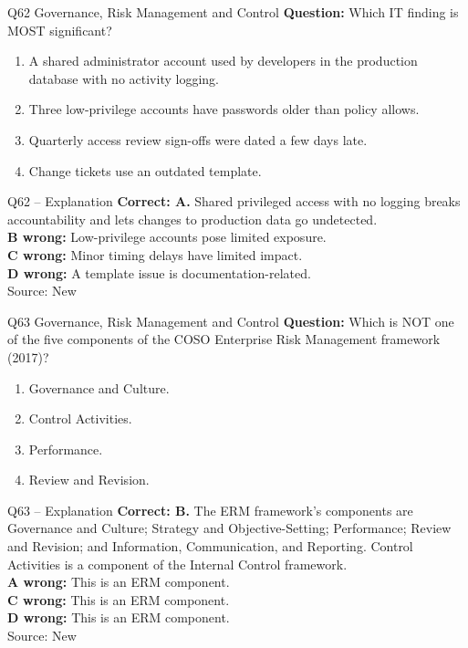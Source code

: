 \documentclass[aspectratio=169,10pt]{beamer}
\begin{document}
\begin{frame}[t]{Q62 \hfill {\scriptsize Governance, Risk Management and Control}}
	\small
	\textbf{Question:} Which IT finding is MOST significant?
	\begin{enumerate}[label=\Alph*.,itemsep=1pt,topsep=3pt]
			\item A shared administrator account used by developers in the production database with no activity logging.
			\item Three low-privilege accounts have passwords older than policy allows.
			\item Quarterly access review sign-offs were dated a few days late.
			\item Change tickets use an outdated template.
	\end{enumerate}
\end{frame}

\begin{frame}[t]{Q62 -- Explanation}
	\footnotesize
	\textbf{Correct: A.} Shared privileged access with no logging breaks accountability and lets changes to production data go undetected. \\[5pt]
\textbf{B wrong:} Low-privilege accounts pose limited exposure. \\[3pt]
\textbf{C wrong:} Minor timing delays have limited impact. \\[3pt]
\textbf{D wrong:} A template issue is documentation-related. \\[3pt]
	\vfill {\tiny Source: New}
\end{frame}

\begin{frame}[t]{Q63 \hfill {\scriptsize Governance, Risk Management and Control}}
	\small
	\textbf{Question:} Which is NOT one of the five components of the COSO Enterprise Risk Management framework (2017)?
	\begin{enumerate}[label=\Alph*.,itemsep=1pt,topsep=3pt]
			\item Governance and Culture.
			\item Control Activities.
			\item Performance.
			\item Review and Revision.
	\end{enumerate}
\end{frame}

\begin{frame}[t]{Q63 -- Explanation}
	\footnotesize
	\textbf{Correct: B.} The ERM framework's components are Governance and Culture; Strategy and Objective-Setting; Performance; Review and Revision; and Information, Communication, and Reporting. Control Activities is a component of the Internal Control framework. \\[5pt]
\textbf{A wrong:} This is an ERM component. \\[3pt]
\textbf{C wrong:} This is an ERM component. \\[3pt]
\textbf{D wrong:} This is an ERM component. \\[3pt]
	\vfill {\tiny Source: New}
\end{frame}
\end{document}
